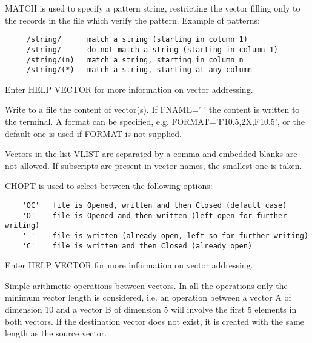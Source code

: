    \par
MATCH is used to specify a pattern string, restricting the vector filling 
   only to the records in the file which verify the pattern. Example of 
   patterns:  
\begin{verbatim}
     /string/      match a string (starting in column 1)
    -/string/      do not match a string (starting in column 1)
     /string/(n)   match a string, starting in column n
     /string/(*)   match a string, starting at any column
\end{verbatim}
   \par
Enter HELP VECTOR for more information on vector addressing.  

\ENDCMD


\BEGARG
{}
\ENDARG
{}
\DEFOPT{\EMPTY}{}
\ENDOPT

   \par
Write to a file the content of vector(s).  If FNAME=' ' the content is 
   written to the terminal.  A format can be specified, e.g. 
   FORMAT='F10.5,2X,F10.5', or the default one is used if FORMAT is not 
   supplied.  

   \par
Vectors in the list VLIST are separated by a comma and embedded blanks are 
   not allowed. If subscripts are present in vector names, the smallest one is 
   taken.  

   \par
CHOPT is used to select between the following options:  
\begin{verbatim}
    'OC'   file is Opened, written and then Closed (default case)
    'O'    file is Opened and then written (left open for further writing)
    ' '    file is written (already open, left so for further writing)
    'C'    file is written and then Closed (already open)
\end{verbatim}
   \par
Enter HELP VECTOR for more information on vector addressing.  

\ENDCMD
{}
\ifMENUtext
   \par
Simple arithmetic operations between vectors.  In all the operations only 
   the minimum vector length is considered, i.e. an operation between a vector 
   A of dimension 10 and a vector B of dimension 5 will involve the first 5 
   elements in both vectors.  If the destination vector does not exist, it is 
   created with the same length as the source vector.  


